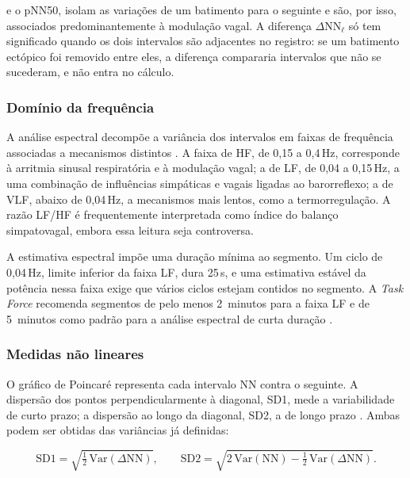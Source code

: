 \noindent
e o \gls{pNN50},
isolam as variações de um batimento para o seguinte e são, por isso,
associados predominantemente à modulação vagal. A diferença
$\Delta \mathrm{NN}_\ell$ só tem significado quando os dois intervalos são
adjacentes no registro: se um batimento ectópico foi removido entre eles, a
diferença compararia intervalos que não se sucederam, e não entra no
cálculo.

\subsubsection{Domínio da frequência}

A análise espectral decompõe a variância dos intervalos em faixas de
frequência associadas a mecanismos distintos \cite{taskforce1996heart}. A
faixa de \gls{HF}, de 0,15 a 0,4\,Hz, corresponde à arritmia
sinusal respiratória e à modulação vagal; a de \gls{LF}, de 0,04 a 0,15\,Hz, a uma combinação de influências simpáticas e vagais
ligadas ao barorreflexo; a de \gls{VLF}, abaixo de 0,04\,Hz, a mecanismos mais lentos, como a termorregulação. A razão LF/HF
é frequentemente interpretada como índice do balanço simpatovagal, embora
essa leitura seja controversa.

A estimativa espectral impõe uma duração mínima ao segmento. Um ciclo de
0,04\,Hz, limite inferior da faixa LF, dura 25\,s, e uma estimativa estável
da potência nessa faixa exige que vários ciclos estejam contidos no
segmento. A \textit{Task Force} recomenda segmentos de pelo menos 2~minutos
para a faixa LF e de 5~minutos como padrão para a análise espectral de
curta duração \cite{taskforce1996heart}.

\subsubsection{Medidas não lineares}

O gráfico de Poincaré representa cada intervalo NN contra o seguinte. A
dispersão dos pontos perpendicularmente à diagonal, SD1, mede a
variabilidade de curto prazo; a dispersão ao longo da diagonal, SD2, a de
longo prazo \cite{brennan2001poincare}. Ambas podem ser obtidas das
variâncias já definidas:

\begin{equation}
	\mathrm{SD1} = \sqrt{\tfrac{1}{2}\,\mathrm{Var}(\Delta \mathrm{NN})},
	\qquad
	\mathrm{SD2} = \sqrt{2\,\mathrm{Var}(\mathrm{NN}) -
		\tfrac{1}{2}\,\mathrm{Var}(\Delta \mathrm{NN})}.
	\label{eq:poincare}
\end{equation}

